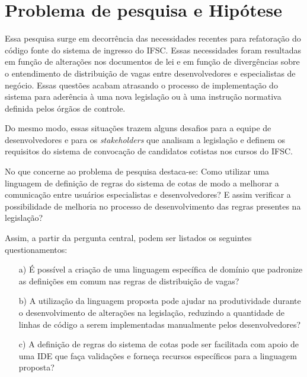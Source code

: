 \section{Problema de pesquisa e Hipótese}
\label{problema}

Essa pesquisa surge em decorrência das necessidades recentes para refatoração do código fonte do sistema de ingresso do \gls{IFSC}. Essas necessidades foram resultadas em função de alterações nos documentos de lei e em função de  divergências sobre o entendimento de distribuição de vagas entre desenvolvedores e especialistas de negócio. Essas questões acabam atrasando o processo de implementação do sistema para aderência à uma nova legislação ou à uma instrução normativa definida pelos órgãos de controle.

Do mesmo modo, essas situações trazem alguns desafios para a equipe de desenvolvedores e para os \textit{stakeholders} que analisam a legislação e definem os requisitos do sistema de convocação de candidatos cotistas nos cursos do \gls{IFSC}. 

No que concerne ao problema de pesquisa destaca-se: 
Como utilizar uma linguagem de definição de regras do sistema de cotas de modo a melhorar a comunicação entre usuários especialistas e desenvolvedores? E assim verificar a possibilidade de melhoria no processo de desenvolvimento das regras presentes na legislação?

Assim, a partir da pergunta central, podem ser listados os seguintes questionamentos:

\begin{enumerate}
    
    \item[a)] É possível a criação de uma linguagem específica de domínio que padronize as definições em comum nas regras de distribuição de vagas?
    
    \item[b)] A utilização da linguagem proposta pode ajudar na produtividade durante o desenvolvimento de alterações na legislação, reduzindo a quantidade de linhas de código a serem implementadas manualmente pelos desenvolvedores?
    
    \item[c)] A definição de regras do sistema de cotas pode ser facilitada com apoio de uma \gls{IDE} que faça validações e forneça recursos específicos para a linguagem proposta?
    

    
\end{enumerate}
